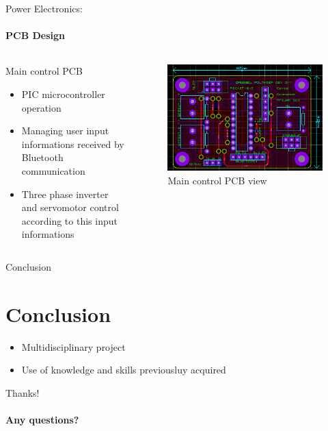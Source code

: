 \documentclass{beamer}
\begin{document}
	\begin{frame}{Power Electronics:}
		\framesubtitle{PCB Design}
		\begin{columns}[T]
	  		\begin{column}{0.5\textwidth}
	  			Main control PCB
		    	\begin{itemize}
		    		\item PIC microcontroller operation
		    		\item Managing user input informations received by Bluetooth communication
		    		\item Three phase inverter and servomotor control according to this input informations
		    	\end{itemize}
	  		\end{column}
	  		\begin{column}{0.5\textwidth}
	  			\begin{figure}
	  				\begin{center}
	  					\includegraphics[height=0.4\textheight]{../Illus/PCB_Main.PNG}
	  				\end{center}
	    			\caption{Main control PCB view}
	    		\end{figure}
	  		\end{column}
		\end{columns}
	\end{frame}	
	\begin{frame}{Conclusion}
	\section*{Conclusion}
	\begin{itemize}
		    \item Multidisciplinary project
		    \item Use of knowledge and skills previousluy acquired
		\end{itemize}
	\end{frame}
	\author[]{Florian POUTHIER - Tristan DRUSSEL\\ \tiny florian.pouthier@insa-strasbourg.fr - tristan.drussel@insa-strasbourg.fr}

	\begin{frame}[plain]{Thanks!}
	\framesubtitle{Any questions?}
	\section*{}
		\titlepage
	\end{frame}
\end{document}
